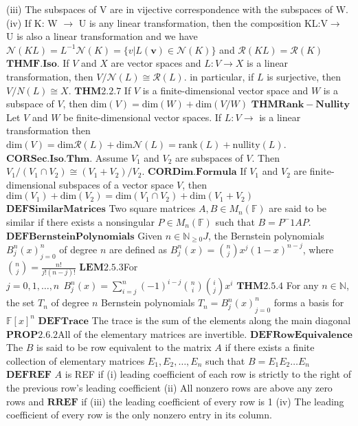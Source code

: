 \documentclass{article}
\theoremstyle{definition}
\begin{document}
{(iii) The subspaces of V are in vijective correspondence with the subspaces of W.
(iv) If K: W $\rightarrow$ U is any linear transformation, then the composition KL:V$\rightarrow$ U is also a linear transformation and we have $\mathscr{N}(KL) = L^{-1} \mathscr{N} (K) = \{v | L(\mathbf{v}) \in \mathscr{N} (K)\}$ and $\mathscr{R} (KL) = \mathscr{R} (K)$
$\mathbf{THM F.Iso.} $ If $V$ and $X$ are vector spaces and $L: V\rightarrow X$ is a linear transformation, then $V/\mathscr{N} (L) \cong \mathscr{R} (L)$. in particular, if $L$ is surjective, then $V/N(L) \cong X$.
$\mathbf{THM2.2.7}$ If $V$ is a finite-dimensional vector space and $W$ is a subspace of $V$, then $\text{dim} (V) = \text{dim} (W) + \text{dim} (V/W) $
$\mathbf{THM Rank-Nullity}$ Let $V$ and $W$ be finite-dimensional vector spaces. If $L:V \rightarrow $ is a linear transformation then $\text{dim} (V) = \text{dim} \mathscr{R} (L) + \text{dim} \mathscr{N} (L) = \text{rank} (L) + \text{nullity} (L)$.
$\mathbf{COR Sec. Iso. Thm.}$ Assume $V_1$ and $V_2$ are subspaces of $V$. Then $V_1/(V_1 \cap V_2) \cong (V_1 + V_2)/V_2$.
$\mathbf{COR Dim. Formula}$ If $V_1$ and $V_2$ are finite-dimensional subspaces of a vector space $V$, then $\text{dim} (V_1) + \text{dim} (V_2) = \text{dim} (V_1 \cap V_2) + \text{dim} (V_1 + V_2)$
$\mathbf{DEF Similar Matrices} $ Two square matrices $A,B \in M_n(\mathbb{F} )$ are said to be similar if there exists a nonsingular $P \in M_n(\mathbb{F} )$ such that $B = P^-1AP$.
$\mathbf{DEF Bernstein Polynomials} $ Given $n \in \mathbb{N}_{\geq 0}J$, the Bernstein polynomials ${B_j^n(x)}_{j=0}^n$ of degree $n$ are defined as $B_j^n(x) = \binom nj x^j(1-x)^{n-j}$, where $\binom nj = \frac{n!}{j!(n-j)!}$
$\mathbf{LEM 2.5.3}$For $j = 0,1,\dots,n ~ ~ B_j^n(x) = \sum^{n}_{i=j}(-1)^{i-j} \binom ni \binom ij x^i $
$\mathbf{THM2.5.4}$ For any $n \in \mathbb{N}$, the set $T_n$ of degree $n$ Bernstein polynomials $T_n = {B_j^n (x) }_{j=0}^n$ forms a basis for $\mathbb{F}[x]^n $
$\mathbf{DEF Trace}$ The trace is the sum of the elements along the main diagonal
$\mathbf{PROP2.6.2}$All of the elementary matrices are invertible.
$\mathbf{DEF Row Equivalence}$The $B$ is said to be row equivalent to the matrix $A$ if there exists a finite collection of elementary matrices $E_1,E_2,\dots, E_n$ such that $B = E_1E_2\dots E_n$
$\mathbf{DEF REF}$ $A$ is REF if (i) leading coefficient of each row is strictly to the right of the previous row's leading coefficient (ii) All nonzero rows are above any zero rows and $ \mathbf{RREF} $ if (iii) the leading coefficient of every row is 1 (iv) The leading coefficient of every row is the only nonzero entry in its column.
}
\end{document}
